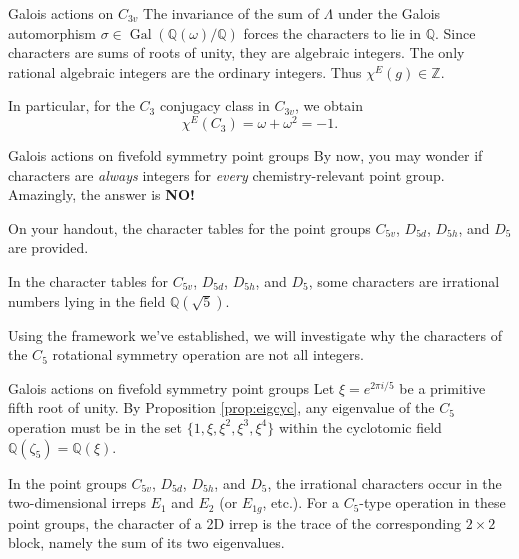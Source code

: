 \documentclass{beamer}
\newcommand{\vs}{\vspace{5mm}}
\DeclareMathOperator{\Gal}{Gal}
\begin{document}
    \begin{frame}{Galois actions on $C_{3v}$}
        The invariance of the sum of $\Lambda$ under the Galois automorphism $\sigma\in\Gal(\mathbb{Q}(\omega)/\mathbb{Q})$ forces the characters to lie in $\mathbb{Q}$. Since characters are sums of roots of unity, they are algebraic integers. The only rational algebraic integers are the ordinary integers. Thus $\chi^E(g)\in\mathbb{Z}$. \cite{roche}
        \vs

        In particular, for the $C_3$ conjugacy class in $C_{3v}$, we obtain
        \[\chi^E(C_3)=\omega+\omega^2=-1.\]
    \end{frame}

    \begin{frame}{Galois actions on fivefold symmetry point groups}
        By now, you may wonder if characters are \emph{always} integers for \emph{every}  chemistry-relevant point group. Amazingly, the answer is \textbf{NO!}\vs

        On your handout, the character tables for the point groups $C_{5v}$, $D_{5d}$, $D_{5h}$, and $D_5$ are provided.
        \vs

        {
            In the character tables for $C_{5v}$, $D_{5d}$, $D_{5h}$, and $D_5$, some characters are irrational numbers lying in the field $\mathbb{Q}(\sqrt{5})$.\vs
        
            Using the framework we've established, we will investigate why the characters of the $C_5$ rotational symmetry operation are not all integers.
        }
    \end{frame}

    \begin{frame}{Galois actions on fivefold symmetry point groups}
        Let $\xi=e^{2\pi i/5}$ be a primitive fifth root of unity. By Proposition \ref{prop:eigcyc}, any eigenvalue of the $C_5$ operation must be in the set $\{1, \xi, \xi^2, \xi^3, \xi^4\}$ within the cyclotomic field $\mathbb{Q}(\zeta_5)=\mathbb{Q}(\xi)$.
        \vs

        In the point groups $C_{5v}$, $D_{5d}$, $D_{5h}$, and $D_5$, the irrational characters occur in the two-dimensional irreps $E_1$ and $E_2$ (or $E_{1g}$, etc.). For a $C_5$-type operation in these point groups, the character of a 2D irrep is the trace of the corresponding $2\times 2$ block, namely the sum of its two eigenvalues.
    \end{frame}
\end{document}
